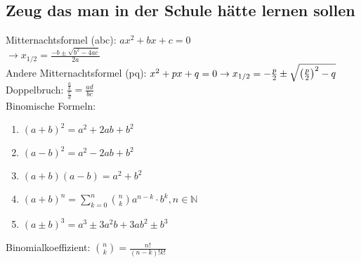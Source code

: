 \documentclass[7pt,a4paper]{scrartcl}
\newcommand{\N}{\ensuremath{\mathbb N}}
\newcommand{\enbrace}[1]{\ensuremath{\left(#1\right)}}
\begin{document}
\begin{multicols}{3}
\section{Zeug das man in der Schule hätte lernen sollen}
Mitternachtsformel (abc): $a x^2 + bx + c = 0$ \\
$\rightarrow x_{1/2} = \frac{-b \pm \sqrt{b^2 - 4ac}}{2a}$ \\
Andere Mitternachtsformel (pq): $x^2+p x+q=0 \\
\rightarrow x_{1/2} = -\frac{p}{2} \pm \sqrt{\enbrace{\frac{p}{2}}^2-q}$ \\
Doppelbruch: $\frac{\frac{a}{b}}{\frac{c}{d}}=\frac{a d}{b c}$ \\
Binomische Formeln:
\begin{enumerate}\itemsep-1pt
	\item $(a+b)^2=a^2+2ab+b^2$
	\item $(a-b)^2=a^2-2ab+b^2$
	\item $(a+b)(a-b)=a^2+b^2$
	\item $(a + b)^n = \sum_{k=0}^{n} \binom{n}{k} a^{n-k} \cdot b^k, n \in \N$
	\item $(a \pm b)^3 = a^3 \pm 3 a^2 b + 3 a b^2 \pm b^3$
\end{enumerate}
Binomialkoeffizient: $\binom{n}{k} = \frac{n!}{(n-k)! k!}$ \\


\end{multicols}
\end{document}
